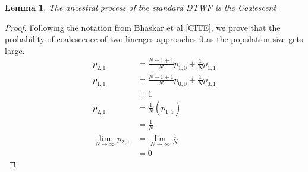 \documentclass[11pt]{article}
\newtheorem{lemma}{Lemma}
\begin{document}
\begin{lemma}
	The ancestral process of the standard DTWF is the Coalescent
\end{lemma}

\begin{proof}
	Following the notation from Bhaskar et al [CITE], we prove that the probability of coalescence of two lineages approaches $0$ as the population size gets large. 	
	$$
	\begin{aligned}
		p_{2,1} &= \frac{N-1+1}{N}p_{1,0} + \frac{1}{N}p_{1,1}\\
		p_{1,1} &= \frac{N-1+1}{N}p_{0,0} + \frac{1}{N}p_{0,1}\\
		&= 1\\
		p_{2,1} &= \frac{1}{N}(p_{1,1})\\
		&= \frac{1}{N}\\
		\lim_{N\to\infty} p_{2,1} &= \lim_{N\to\infty} \frac{1}{N}\\
		&= 0
	\end{aligned}
	$$
\end{proof}
\end{document}
